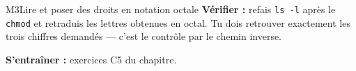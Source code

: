 \begin{fichemethode}{M3}{Lire et poser des droits en notation octale}
\textbf{Vérifier :} refais \lstinline{ls -l} après le \lstinline{chmod} et retraduis les
lettres obtenues en octal. Tu dois retrouver exactement les trois chiffres demandés — c'est
le contrôle par le chemin inverse.

\textbf{S'entraîner :} exercices C5 du chapitre.
\end{fichemethode}
